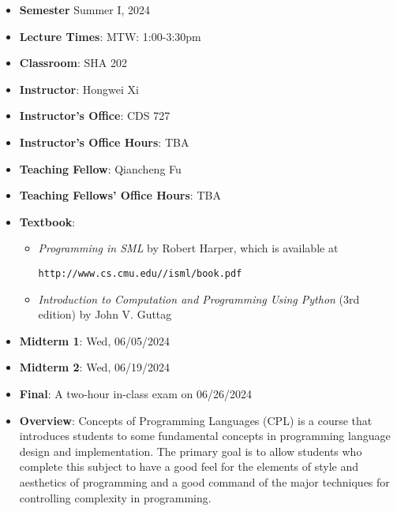 \documentclass[11pt]{article}
\begin{document}
\begin{itemize}
\item {\bf Semester} Summer I, 2024

\item {\bf Lecture Times}: MTW: 1:00-3:30pm

\item {\bf Classroom}: SHA 202

\item {\bf Instructor}: Hongwei Xi
\item {\bf Instructor's Office}: CDS 727
\item {\bf Instructor's Office Hours}: TBA

\item {\bf Teaching Fellow}: Qiancheng Fu
\item {\bf Teaching Fellows' Office Hours}: TBA


\item {\bf Textbook}:\kern6pt
\begin{itemize}
\item
{\em Programming in SML} by Robert Harper, which is available at
\begin{center}
\texttt{http://www.cs.cmu.edu//isml/book.pdf}
\end{center}
\item
{\em Introduction to Computation and Programming Using Python} (3rd edition) by John V. Guttag
\end{itemize}

\item
{\bf Midterm 1}\kern6pt: Wed, 06/05/2024
\item
{\bf Midterm 2}\kern6pt: Wed, 06/19/2024

\item {\bf Final}:\kern6pt A two-hour in-class exam on 06/26/2024

\item {\bf Overview}:
Concepts of Programming Languages (CPL) is a course that introduces
students to some fundamental concepts in programming language design and
implementation. The primary goal is to allow students who complete this
subject to have a good feel for the elements of style and aesthetics of
programming and a good command of the major techniques for controlling
complexity in programming.


\end{itemize}
\end{document}
